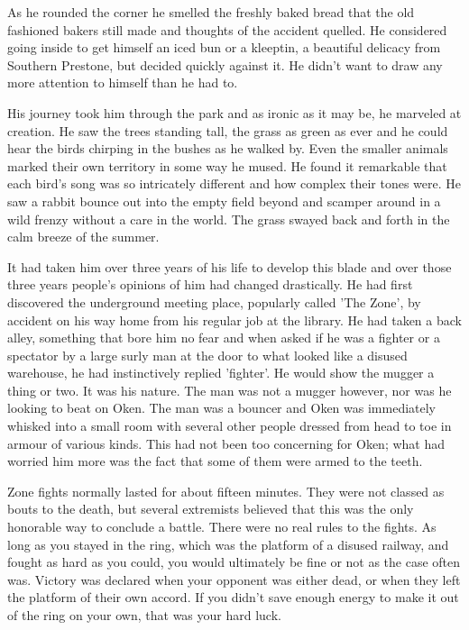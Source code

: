 As he rounded the corner he smelled the freshly baked bread that the old fashioned bakers still made and thoughts of the accident quelled. He considered going inside to get himself an iced bun or a kleeptin, a beautiful delicacy from Southern Prestone, but decided quickly against it. He didn't want to draw any more attention to himself than he had to.

His journey took him through the park and as ironic as it may be, he marveled at creation. He saw the trees standing tall, the grass as green as ever and he could hear the birds chirping in the bushes as he walked by. Even the smaller animals marked their own territory in some way he mused. He found it remarkable that each bird's song was so intricately different and how complex their tones were. He saw a rabbit bounce out into the empty field beyond and scamper around in a wild frenzy without a care in the world. The grass swayed back and forth in the calm breeze of the summer.

It had taken him over three years of his life to develop this blade and over those three years people's opinions of him had changed drastically. He had first discovered the underground meeting place, popularly called 'The Zone', by accident on his way home from his regular job at the library. He had taken a back alley, something that bore him no fear and when asked if he was a fighter or a spectator by a large surly man at the door to what looked like a disused warehouse, he had instinctively replied 'fighter'. He would show the mugger a thing or two. It was his nature. The man was not a mugger however, nor was he looking to beat on Oken. The man was a bouncer and Oken was immediately whisked into a small room with several other people dressed from head to toe in armour of various kinds. This had not been too concerning for Oken; what had worried him more was the fact that some of them were armed to the teeth.

Zone fights normally lasted for about fifteen minutes. They were not classed as bouts to the death, but several extremists believed that this was the only honorable way to conclude a battle. There were no real rules to the fights. As long as you stayed in the ring, which was the platform of a disused railway, and fought as hard as you could, you would ultimately be fine or not as the case often was. Victory was declared when your opponent was either dead, or when they left the platform of their own accord. If you didn't save enough energy to make it out of the ring on your own, that was your hard luck.


